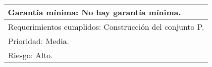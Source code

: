 \begin{longtable}{|l|l|}
\multicolumn{2}{|l|}{Garantía mínima: No hay garantía mínima.}                                                                                                                                                                                                                                                                                                                                         \\ \hline
\multicolumn{2}{|l|}{Requerimientos cumplidos: Construcción del conjunto P.}                                                                                                                                                                                                                                                                                                                           \\ \hline
\multicolumn{2}{|l|}{Prioridad: Media.}                                                                                                                                                                                                                                                                                                                                                                \\ \hline
\multicolumn{2}{|l|}{Riesgo: Alto.}                                                                                                                                                                                                                                                                                                                                                                    \\ \hline
\end{longtable}